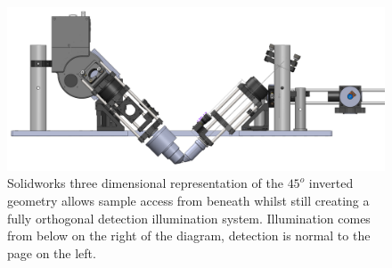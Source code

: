 

\begin{figure}
\centering
\includegraphics[width=1\linewidth]{"Figures/solidworks_design _front"}
\caption[CAD design of the $45^o$ detection and excitation]{Solidworks three dimensional representation of the $45^o$ inverted geometry allows sample access from beneath whilst still creating a fully orthogonal detection illumination system.
Illumination comes from below on the right of the diagram, detection is normal to the page on the left.}
\label{fig:solidworks_design_front}
\end{figure}

